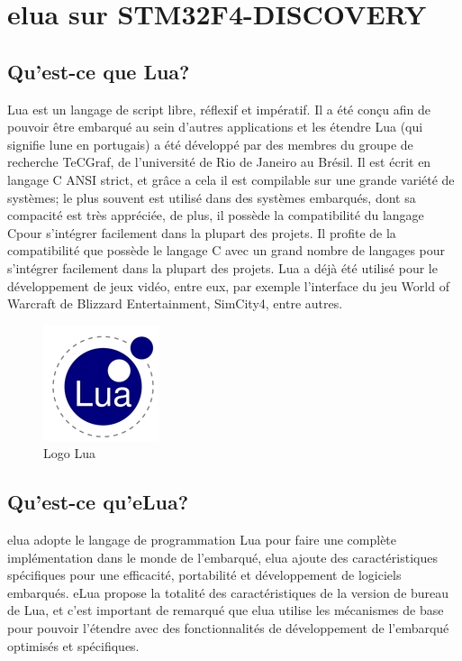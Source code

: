 \chapter[elua sur STM32F4-DISCOVERY]{elua sur STM32F4-DISCOVERY}
\label{chap:chap3}

\section{Qu'est-ce que Lua?}

Lua est un langage de script libre, réflexif et impératif. Il a été conçu afin de pouvoir être embarqué au sein d'autres applications et les étendre
Lua (qui signifie lune en portugais) a été développé par des membres du groupe de recherche TeCGraf, de l'université de Rio de Janeiro au Brésil.
Il est écrit en langage C ANSI strict, et grâce a cela il est compilable sur une grande variété de systèmes; le plus souvent est utilisé dans des systèmes 
embarqués, dont sa compacité est très appréciée, de plus, il possède la compatibilité du langage Cpour s'intégrer facilement dans la plupart des projets.
Il profite de la compatibilité que possède le langage C avec un grand nombre de langages pour s'intégrer facilement dans la plupart des projets. Lua a déjà
été utilisé pour le développement de jeux vidéo, entre eux, par exemple l'interface du jeu World of Warcraft de Blizzard Entertainment, SimCity4, entre 
autres.

\begin{figure}[h]
\begin{center}
\includegraphics[scale=1]{figure/eLua/Lua.JPG}
\caption{Logo Lua}
\end{center}
\end{figure}


\section{Qu'est-ce qu'eLua?}

  elua adopte le langage de programmation Lua pour faire une complète implémentation dans le monde de l'embarqué, elua ajoute des caractéristiques
spécifiques pour une efficacité, portabilité et développement de logiciels embarqués. eLua propose la totalité des caractéristiques de la version
de bureau de Lua, et c'est important de remarqué que elua utilise les mécanismes de base pour pouvoir l'étendre avec des fonctionnalités de développement 
de l'embarqué optimisés et spécifiques.
 

